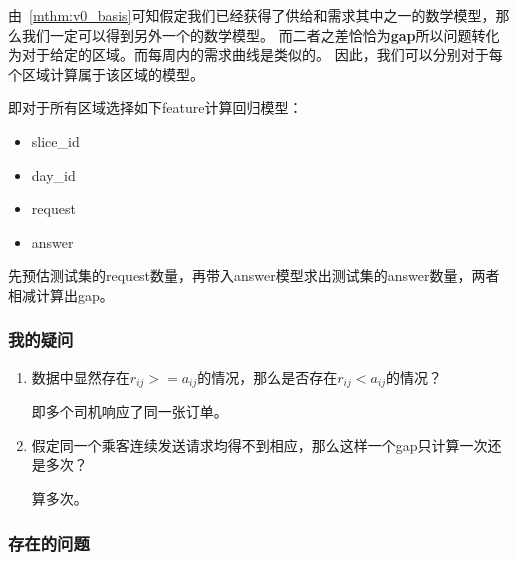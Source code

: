 \documentclass[hyperref,UTF8]{ctexart}
\theoremstyle{definition}
\theoremstyle{remark}
\numberwithin{equation}{subsection}
\newcommand{\Emph}{\textbf}
\begin{document}
	由~\ref{mthm:v0_basis}可知假定我们已经获得了供给和需求其中之一的数学模型，那么我们一定可以得到另外一个的数学模型。
	而二者之差恰恰为\Emph{gap}所以问题转化为对于给定的区域。而每周内的需求曲线是类似的。
	因此，我们可以分别对于每个区域计算属于该区域的模型。
	
	即对于所有区域选择如下feature计算回归模型：
	\begin{itemize}
		\item slice\_id
		\item day\_id
		\item request
		\item answer
	\end{itemize}
	
	先预估测试集的request数量，再带入answer模型求出测试集的answer数量，两者相减计算出gap。
	
\subsubsection{我的疑问}

	\begin{enumerate}[(1)]
		
		\item 数据中显然存在$r_{ij} >= a_{ij}$的情况，那么是否存在$r_{ij} < a_{ij}$的情况？
		
		即多个司机响应了同一张订单。
		
		\item 假定同一个乘客连续发送请求均得不到相应，那么这样一个gap只计算一次还是多次？
		
		算多次。
		
	\end{enumerate}
	
\subsubsection{存在的问题}
	
\end{document}

